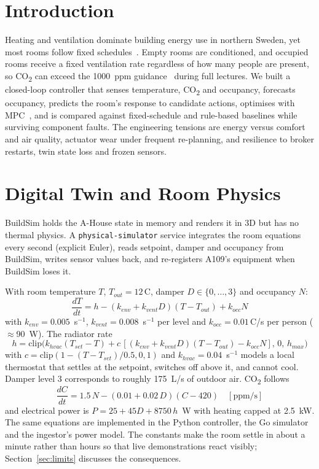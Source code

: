 \documentclass[conference,10pt]{IEEEtran}
\newcommand{\cotwo}{CO\textsubscript{2}}
\newcommand{\degC}{\,\textdegree{}C}
\begin{document}
\section{Introduction}
Heating and ventilation dominate building energy use in northern Sweden, yet most rooms follow fixed schedules~\cite{ashrae901}. Empty rooms are conditioned, and occupied rooms receive a fixed ventilation rate regardless of how many people are present, so \cotwo{} can exceed the 1000~ppm guidance~\cite{afs2020} during full lectures. We built a closed-loop controller that senses temperature, \cotwo{} and occupancy, forecasts occupancy, predicts the room's response to candidate actions, optimises with MPC~\cite{camacho2013model}, and is compared against fixed-schedule and rule-based baselines while surviving component faults. The engineering tensions are energy versus comfort~\cite{ashrae55, en16798} and air quality, actuator wear under frequent re-planning, and resilience to broker restarts, twin state loss and frozen sensors.

\section{Digital Twin and Room Physics}
BuildSim holds the A-House state in memory and renders it in 3D but has no thermal physics. A \texttt{physical-simulator} service integrates the room equations every second (explicit Euler), reads setpoint, damper and occupancy from BuildSim, writes sensor values back, and re-registers A109's equipment when BuildSim loses it.

With room temperature $T$, $T_{out}=12$\degC, damper $D\in\{0,\dots,3\}$ and occupancy $N$:
\begin{equation}
\frac{dT}{dt} = h - (k_{env} + k_{vent} D)(T - T_{out}) + k_{occ} N
\end{equation}
with $k_{env}=0.005$~s$^{-1}$, $k_{vent}=0.008$~s$^{-1}$ per level and $k_{occ}=0.01$\degC/s per person ($\approx$90~W). The radiator rate
\begin{equation}
h = \mathrm{clip}\big(k_{hvac}(T_{set}-T) + c\,[(k_{env}+k_{vent}D)(T-T_{out}) - k_{occ}N],\,0,\,h_{max}\big)
\end{equation}
with $c=\mathrm{clip}(1-(T-T_{set})/0.5,0,1)$ and $k_{hvac}=0.04$~s$^{-1}$ models a local thermostat that settles at the setpoint, switches off above it, and cannot cool. Damper level 3 corresponds to roughly 175~L/s of outdoor air. \cotwo{} follows
\begin{equation}
\frac{dC}{dt} = 1.5\,N - (0.01 + 0.02\,D)(C - 420)\quad[\text{ppm/s}]
\end{equation}
and electrical power is $P = 25 + 45D + 8750\,h$~W with heating capped at 2.5~kW. The same equations are implemented in the Python controller, the Go simulator and the ingestor's power model. The constants make the room settle in about a minute rather than hours so that live demonstrations react visibly; Section~\ref{sec:limits} discusses the consequences.
\end{document}

